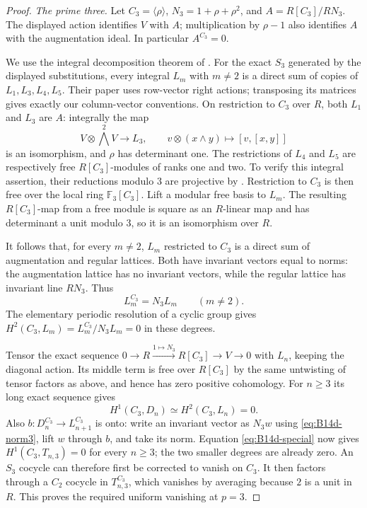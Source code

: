\begin{proof}
\emph{The prime three.}
Let $C_3=\langle\rho\rangle$, $N_3=1+\rho+\rho^2$,
and $A=R[C_3]/RN_3$. The displayed action identifies
$V$ with $A$; multiplication by $\rho-1$ also identifies
$A$ with the augmentation ideal. In particular $A^{C_3}=0$.

We use the integral decomposition theorem of
\citet[Theorem 7.1, p.~453]{KovacsStohr2000LiePowers}.
For the exact $S_3$ generated by the displayed substitutions,
every integral $L_m$ with $m\ne2$ is a direct sum of
copies of $L_1,L_3,L_4,L_5$. Their paper uses row-vector
right actions; transposing its matrices gives exactly
our column-vector conventions.
On restriction to $C_3$ over $R$, both $L_1$ and $L_3$
are $A$: integrally the map
\[
 V\otimes\bigwedge^2 V\longrightarrow L_3,
 \qquad v\otimes(x\wedge y)\longmapsto[v,[x,y]]
\]
is an isomorphism, and $\rho$ has determinant one.
The restrictions of $L_4$ and $L_5$ are respectively
free $R[C_3]$-modules of ranks one and two. To verify
this integral assertion, their reductions modulo $3$
are projective by
\citet[Corollary 4.4, p.~441]{KovacsStohr2000LiePowers}.
Restriction to $C_3$ is then free over the local ring
$\mathbb F_3[C_3]$. Lift a modular free basis to $L_m$.
The resulting $R[C_3]$-map from a free module is square
as an $R$-linear map and has determinant a unit modulo
$3$, so it is an isomorphism over $R$.

It follows that, for every $m\ne2$, $L_m$ restricted
to $C_3$ is a direct sum of augmentation and regular
lattices. Both have invariant vectors equal to norms:
the augmentation lattice has no invariant vectors,
while the regular lattice has invariant line $RN_3$.
Thus
\begin{equation}\label{eq:B14d-norm3}
 L_m^{C_3}=N_3L_m\qquad(m\ne2).
\end{equation}
The elementary periodic resolution of a cyclic group
gives $H^2(C_3,L_m)=L_m^{C_3}/N_3L_m=0$ in these degrees.

Tensor the exact sequence
$0\to R\xrightarrow{1\mapsto N_3}R[C_3]\to V\to0$
with $L_n$, keeping the diagonal action. Its middle term
is free over $R[C_3]$ by the same untwisting of tensor
factors as above, and hence has zero positive cohomology.
For $n\geq3$ its long exact sequence gives
\[
 H^1(C_3,D_n)\simeq H^2(C_3,L_n)=0.
\]
Also $b:D_n^{C_3}\to L_{n+1}^{C_3}$ is onto:
write an invariant vector as $N_3w$ using
\eqref{eq:B14d-norm3}, lift $w$ through $b$, and take
its norm. Equation \eqref{eq:B14d-special} now gives
$H^1(C_3,T_{n,3})=0$ for every $n\geq3$; the two
smaller degrees are already zero.
An $S_3$ cocycle can therefore first be corrected to
vanish on $C_3$. It then factors through a $C_2$ cocycle
in $T_{n,3}^{C_3}$, which vanishes by averaging because
$2$ is a unit in $R$. This proves the required uniform
vanishing at $p=3$.


\end{proof}
